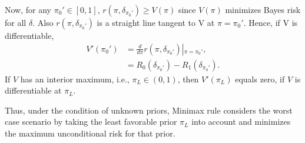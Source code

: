 \documentclass[a4paper,english,12pt]{article}
\begin{document}
Now, for any $\pi_0' \in [0,1]$, $r(\pi,\delta_{\pi_0'})\geq V(\pi)$ since $V(\pi)$ minimizes Bayes risk for all $\delta$. Also $r(\pi,\delta_{\pi_0'})$ is a straight line tangent to V at $\pi=\pi_0'$. Hence, if V is differentiable,
\begin{align}
V'(\pi_0') &= \frac{d}{{d\pi }}r(\pi ,{\delta _{{\pi _0'}}})\left| {_{\pi  = {\pi _0'}}}, \right.\\\nonumber
&= {R_0}({\delta_{{\pi_0'}}})- {R_1}({\delta_{{\pi_0'}}}).
\end{align} 
If $V$ has an interior maximum, i.e., $\pi_L\in (0,1)$, then $V'(\pi_L)$ equals zero, if $V$ is differentiable at $\pi_L$. 
\par Thus, under the condition of unknown priors, Minimax rule considers the worst case scenario by taking the least favorable prior $\pi_L$ into account and minimizes the maximum unconditional risk for that prior.
\end{document}

